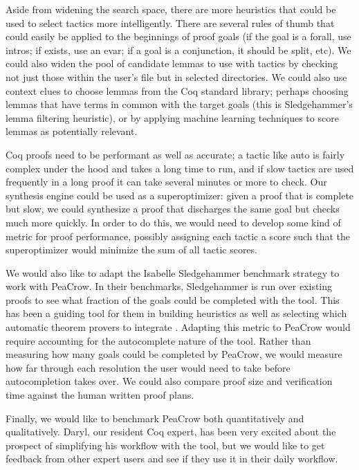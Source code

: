 \documentclass{article}
\begin{document}
Aside from widening the search space, there are more heuristics that could be used to select tactics more intelligently. There are several rules of thumb that could easily be applied to the beginnings of proof goals (if the goal is a forall, use intros; if exists, use an evar; if a goal is a conjunction, it should be split, etc). We could also widen the pool of candidate lemmas to use with tactics by checking not just those within the user’s file but in selected directories. We could also use context clues to choose lemmas from the Coq standard library; perhaps choosing lemmas that have terms in common with the target goals (this is Sledgehammer’s lemma filtering heuristic), or by applying machine learning techniques to score lemmas as potentially relevant.

Coq proofs need to be performant as well as accurate; a tactic like auto is fairly complex under the hood and takes a long time to run, and if slow tactics are used frequently in a long proof it can take several minutes or more to check. Our synthesis engine could be used as a superoptimizer: given a proof that is complete but slow, we could synthesize a proof that discharges the same goal but checks much more quickly. In order to do this, we would need to develop some kind of metric for proof performance, possibly assigning each tactic a score such that the superoptimizer would minimize the sum of all tactic scores.

 We would also like to adapt the Isabelle Sledgehammer benchmark strategy to work with PeaCrow. In their benchmarks, Sledgehammer is run over existing proofs to see what fraction of the goals could be completed with the tool. This has been a guiding tool for them in building heuristics as well as selecting which automatic theorem provers to integrate \cite{meng2004experiments}. Adapting this metric to PeaCrow would require accounting for the autocomplete nature of the tool. Rather than measuring how many goals could be completed by PeaCrow, we would measure how far through each resolution the user would need to take before autocompletion takes over. We could also compare proof size and verification time against the human written proof plans.

Finally, we would like to benchmark PeaCrow both quantitatively and qualitatively. Daryl, our resident Coq expert, has been very excited about the prospect of simplifying his workflow with the tool, but we would like to get feedback from other expert users and see if they use it in their daily workflow.
\end{document}
